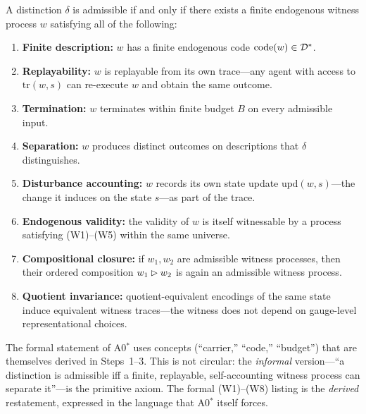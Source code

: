 \begin{axiom}
\label{ax:a0star}
A distinction $\delta$ is admissible if and only if there exists a finite
endogenous witness process $w$ satisfying all of the following:
\begin{enumerate}[nosep, label=(W\arabic*)]
  \item \textbf{Finite description:} $w$ has a finite endogenous code
        $\mathrm{code}(w) \in \mathcal{D}^*$.
  \item \textbf{Replayability:} $w$ is replayable from its own trace---any
        agent with access to $\mathrm{tr}(w,s)$ can re-execute $w$ and
        obtain the same outcome.
  \item \textbf{Termination:} $w$ terminates within finite budget $B$
        on every admissible input.
  \item \textbf{Separation:} $w$ produces distinct outcomes on descriptions
        that $\delta$ distinguishes.
  \item \textbf{Disturbance accounting:} $w$ records its own state update
        $\mathrm{upd}(w,s)$---the change it induces on the state $s$---as
        part of the trace.
  \item \textbf{Endogenous validity:} the validity of $w$ is itself
        witnessable by a process satisfying (W1)--(W5) within the same
        universe.
  \item \textbf{Compositional closure:} if $w_1, w_2$ are admissible
        witness processes, then their ordered composition
        $w_1 \mathbin{\vartriangleright} w_2$ is again an admissible witness process.
  \item \textbf{Quotient invariance:} quotient-equivalent encodings of the
        same state induce equivalent witness traces---the witness does not
        depend on gauge-level representational choices.
\end{enumerate}
\end{axiom}

\begin{remark}
\label{rem:a0star-bootstrap}
The formal statement of A0$^*$ uses concepts (``carrier,'' ``code,''
``budget'') that are themselves derived in Steps~1--3.  This is not
circular: the \emph{informal} version---``a distinction is admissible iff
a finite, replayable, self-accounting witness process can separate it''---is
the primitive axiom.  The formal (W1)--(W8) listing is the \emph{derived}
restatement, expressed in the language that A0$^*$ itself forces.
\end{remark}

